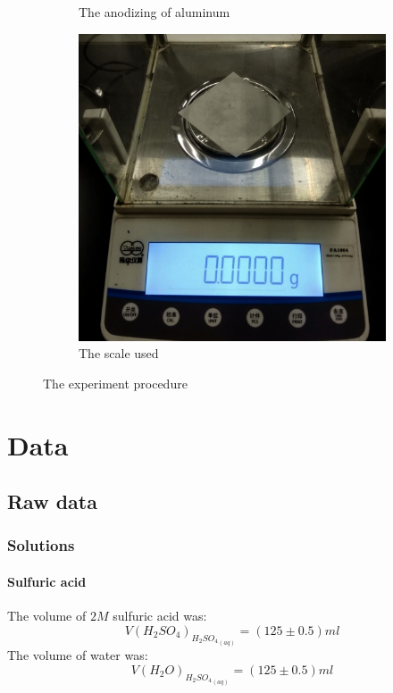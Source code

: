 \documentclass[a4paper]{article}
\begin{document}
\begin{figure}[ht]
\begin{subfigure}[b]{0.3\textwidth}
    \caption{The anodizing of aluminum}
    \label{fig:anodizing}
  \end{subfigure}
  \begin{subfigure}[b]{0.3\textwidth}
    \centering
    \includegraphics[width=\textwidth]{img/scale}
    \caption{The scale used}
    \label{fig:scale}
  \end{subfigure}

  \caption{The experiment procedure}
  \label{fig:experiment}
\end{figure}

\section{Data}

\subsection{Raw data}

\subsubsection{Solutions}

\paragraph{Sulfuric acid}
The volume of $2M$ sulfuric acid was:
$$V(H_2SO_4)_{{H_2SO_4}_{(aq)}} = (125 \pm 0.5) \si{ml}$$
The volume of water was:
$$V(H_2O)_{{H_2SO_4}_{(aq)}} = (125 \pm 0.5) \si{ml}$$
\end{document}
